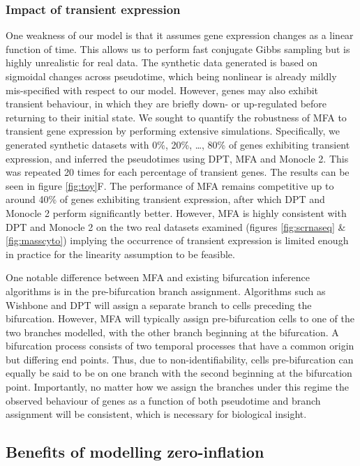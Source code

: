 \subsubsection{Impact of transient expression}

One weakness of our model is that it assumes gene expression changes as a linear function of time. This allows us to perform fast conjugate Gibbs sampling but is highly unrealistic for real data.
The synthetic data generated is based on sigmoidal changes across pseudotime, which being nonlinear is already mildly mis-specified with respect to our model.
However, genes may also exhibit transient behaviour, in which they are briefly down- or up-regulated before returning to their initial state. We sought to quantify the robustness of MFA to transient gene expression by performing extensive simulations. Specifically, we generated synthetic datasets with 0\%, 20\%, \ldots, 80\% of genes exhibiting transient expression, and inferred the pseudotimes using DPT, MFA and Monocle 2. This was repeated 20 times for each percentage of transient genes. The results can be seen in figure \ref{fig:toy}F. The performance of MFA remains competitive up to around 40\% of genes exhibiting transient expression, after which DPT and Monocle 2 perform significantly better. However, MFA is highly consistent with DPT and Monocle 2 on the two real datasets examined (figures \ref{fig:scrnaseq} \& \ref{fig:masscyto}) implying the occurrence of transient expression is limited enough in practice for the linearity assumption to be feasible.

One notable difference between MFA and existing bifurcation inference algorithms is in the pre-bifurcation branch assignment. Algorithms such as Wishbone and DPT will assign a separate branch to cells preceding the bifurcation. However, MFA will typically assign pre-bifurcation cells to one of the two branches modelled, with the other branch beginning at the bifurcation. A bifurcation process consists of two temporal processes that have a common origin but differing end points. Thus, due to non-identifiability, cells pre-bifurcation can equally be said to be on one branch with the second beginning at the bifurcation point. Importantly, no matter how we assign the branches under this regime the observed behaviour of genes as a function of both pseudotime and branch assignment will be consistent, which is necessary for biological insight.

\subsection{Benefits of modelling zero-inflation}

